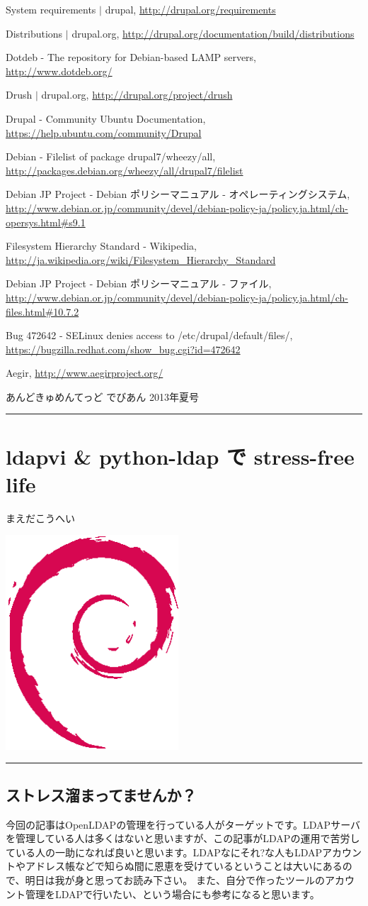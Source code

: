 \documentclass[mingoth,a4paper]{jsarticle}
\renewcommand{\dancersection}[2]{%
\newpage
あんどきゅめんてっど でびあん 2013年夏号
%
\vspace{0.1mm}\\
{\color{dancerdarkblue}\rule{\hsize}{2mm}}

%
%
\begin{minipage}[t]{0.6\hsize}
\color{dancerdarkblue}
\vspace{1cm}
\section{#1}
\hfill{}#2\\
\end{minipage}
\begin{minipage}[t]{0.4\hsize}
\vspace{-2cm}
\hfill{}\includegraphics[height=8cm]{image200502/openlogo-nd.eps}\\
\vspace{-5cm}
\end{minipage}
%
{\color{dancerlightblue}\rule{0.66\hsize}{2mm}}
%
\vspace{2cm}
}
\begin{document}
\begin{thebibliography}{9}

System requirements $|$ drupal, \url{http://drupal.org/requirements}

Distributions $|$ drupal.org, \url{http://drupal.org/documentation/build/distributions}

Dotdeb - The repository for Debian-based LAMP servers, \url{http://www.dotdeb.org/}

Drush $|$ drupal.org, \url{http://drupal.org/project/drush}

Drupal - Community Ubuntu Documentation, \url{https://help.ubuntu.com/community/Drupal}

Debian - Filelist of package drupal7/wheezy/all, \url{http://packages.debian.org/wheezy/all/drupal7/filelist}

Debian JP Project - Debian ポリシーマニュアル - オペレーティングシステム, \url{http://www.debian.or.jp/community/devel/debian-policy-ja/policy.ja.html/ch-opersys.html\#s9.1}

Filesystem Hierarchy Standard - Wikipedia, \url{http://ja.wikipedia.org/wiki/Filesystem_Hierarchy_Standard}

Debian JP Project - Debian ポリシーマニュアル - ファイル, \url{http://www.debian.or.jp/community/devel/debian-policy-ja/policy.ja.html/ch-files.html\#10.7.2}

Bug 472642 - SELinux denies access to /etc/drupal/default/files/, \url{https://bugzilla.redhat.com/show_bug.cgi?id=472642}

Aegir, \url{http://www.aegirproject.org/}

\end{thebibliography}

\dancersection{ldapvi \& python-ldap で stress-free life}{まえだこうへい}
\subsection{ストレス溜まってませんか？}

今回の記事はOpenLDAPの管理を行っている人がターゲットです。LDAPサーバを管理している人は多くはないと思いますが、この記事がLDAPの運用で苦労している人の一助になれば良いと思います。LDAPなにそれ?な人もLDAPアカウントやアドレス帳などで知らぬ間に恩恵を受けているということは大いにあるので、明日は我が身と思ってお読み下さい。
また、自分で作ったツールのアカウント管理をLDAPで行いたい、という場合にも参考になると思います。
\end{document}
